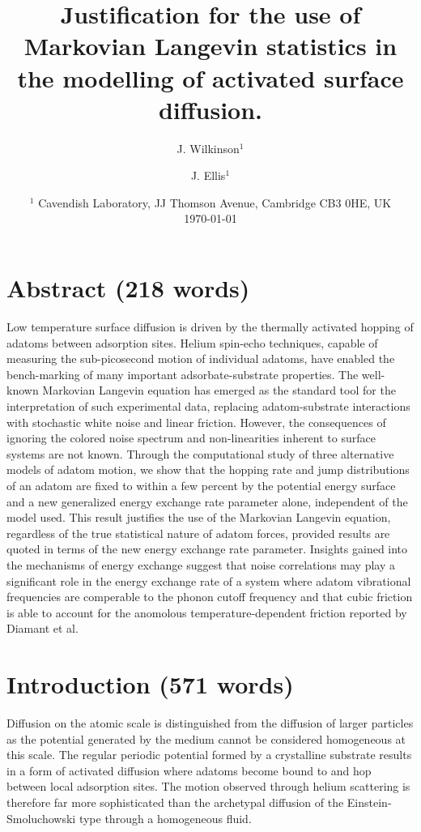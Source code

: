 \documentclass[7pt]{article}
\title{Justification for the use of Markovian Langevin statistics in the modelling of activated surface diffusion.}
\author{J. Wilkinson$^1$ \and J. Ellis$^1$}
\date{%
	$^1$ Cavendish Laboratory, JJ Thomson Avenue, Cambridge CB3 0HE, UK \\[2ex]%
    \today
}
\begin{document}
\maketitle

\section*{Abstract (218 words)}

Low temperature surface diffusion is driven by the thermally activated hopping of adatoms between adsorption sites. Helium spin-echo techniques, capable of measuring the sub-picosecond motion of individual adatoms, have enabled the bench-marking of many important adsorbate-substrate properties. The well-known Markovian Langevin equation has emerged as the standard tool for the interpretation of such experimental data, replacing adatom-substrate interactions with stochastic white noise and linear friction. However, the consequences of ignoring the colored noise spectrum and non-linearities inherent to surface systems are not known. Through the computational study of three alternative models of adatom motion, we show that the hopping rate and jump distributions of an adatom are fixed to within a few percent by the potential energy surface and a new generalized energy exchange rate parameter alone, independent of the model used. This result justifies the use of the Markovian Langevin equation, regardless of the true statistical nature of adatom forces, provided results are quoted in terms of the new energy exchange rate parameter. Insights gained into the mechanisms of energy exchange suggest that noise correlations may play a significant role in the energy exchange rate of a system where adatom vibrational frequencies are comperable to the phonon cutoff frequency and that cubic friction is able to account for the anomolous temperature-dependent friction reported by Diamant et al.

\section*{Introduction (571 words)}

Diffusion on the atomic scale is distinguished from the diffusion of larger particles as the potential generated by the medium cannot be considered homogeneous at this scale\cite{Jardine2004}. The regular periodic potential formed by a crystalline substrate results in a form of activated diffusion where adatoms become bound to and hop between local adsorption sites. The motion observed through helium scattering is therefore far more sophisticated than the archetypal diffusion of the Einstein-Smoluchowski type through a homogeneous fluid\cite{Jardine200906}.
\end{document}
